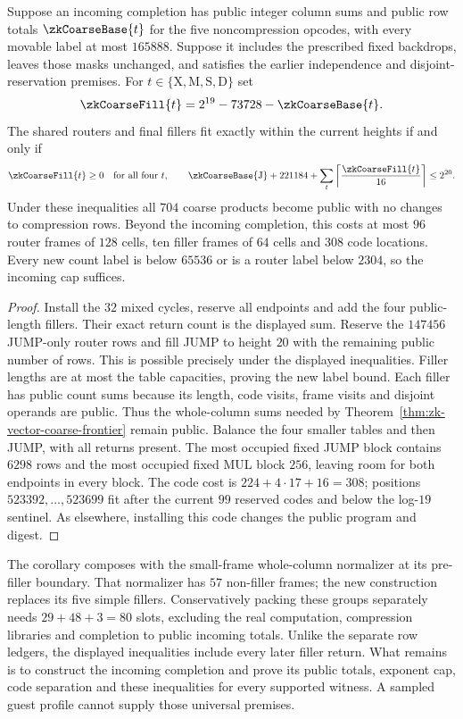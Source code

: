 \begin{corollary}\label{cor:zk-common-coarse-budget}
Suppose an incoming completion has public integer column sums and public row totals $\zkCoarseBase{t}$ for the five noncompression opcodes, with every movable label at most $165888$. Suppose it includes the prescribed fixed backdrops, leaves those masks unchanged, and satisfies the earlier independence and disjoint-reservation premises. For $t\in\{\mathrm{X},\mathrm{M},\mathrm{S},\mathrm{D}\}$ set
\[
 \zkCoarseFill{t}=2^{19}-73728-\zkCoarseBase{t}.
\]
The shared routers and final fillers fit exactly within the current heights if and only if
\[
 \zkCoarseFill{t}\ge0\quad\text{for all four }t,
 \qquad
 \zkCoarseBase{\mathrm{J}}+221184+
 \sum_t\left\lceil\frac{\zkCoarseFill{t}}{16}\right\rceil\le2^{20}.
\]
Under these inequalities all $704$ coarse products become public with no changes to compression rows. Beyond the incoming completion, this costs at most $96$ router frames of $128$ cells, ten filler frames of $64$ cells and $308$ code locations. Every new count label is below $65536$ or is a router label below $2304$, so the incoming cap suffices.
\end{corollary}
\begin{proof}
Install the $32$ mixed cycles, reserve all endpoints and add the four public-length fillers. Their exact return count is the displayed sum. Reserve the $147456$ JUMP-only router rows and fill JUMP to height $20$ with the remaining public number of rows. This is possible precisely under the displayed inequalities. Filler lengths are at most the table capacities, proving the new label bound. Each filler has public count sums because its length, code visits, frame visits and disjoint operands are public. Thus the whole-column sums needed by Theorem~\ref{thm:zk-vector-coarse-frontier} remain public. Balance the four smaller tables and then JUMP, with all returns present. The most occupied fixed JUMP block contains $6298$ rows and the most occupied fixed MUL block $256$, leaving room for both endpoints in every block. The code cost is $224+4\cdot17+16=308$; positions $523392,\ldots,523699$ fit after the current $99$ reserved codes and below the log-$19$ sentinel. As elsewhere, installing this code changes the public program and digest.
\end{proof}

The corollary composes with the small-frame whole-column normalizer at its pre-filler boundary. That normalizer has $57$ non-filler frames; the new construction replaces its five simple fillers. Conservatively packing these groups separately needs $29+48+3=80$ slots, excluding the real computation, compression libraries and completion to public incoming totals. Unlike the separate row ledgers, the displayed inequalities include every later filler return. What remains is to construct the incoming completion and prove its public totals, exponent cap, code separation and these inequalities for every supported witness. A sampled guest profile cannot supply those universal premises.

